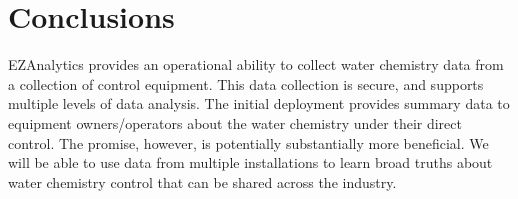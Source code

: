 \section{Conclusions}
\label{sec:conclude}

EZAnalytics provides an operational ability to collect water chemistry
data from a collection of control equipment.  This data collection
is secure, and supports multiple levels of data analysis.
The initial deployment provides summary data to equipment owners/operators
about the water chemistry under their direct control.
The promise, however, is potentially substantially more beneficial.  We will
be able to use data from multiple installations to learn broad truths
about water chemistry control that can be shared across the industry.
